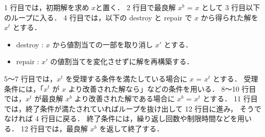 1 行目では，初期解を求め $x$と置く．
2 行目で最良解 $x^b$ = $x$ として 3 行目以下のループに入る．
4 行目では，以下の destroy と repair で $x$ から得られた解を $x^t$ とする．
\begin{itemize}
\item destroy : $x$ から値割当ての一部を取り消し $x′$ とする．
\item repair : $x′$ の値割当てを変化させずに解を再構築する．
\end{itemize}
5〜7 行目では，$x^t$ を受理する条件を満たしている場合に $x$ = $x^t$ とする．
受理条件には，「$x^t$ が $x$ より改善された解なら」などの条件を用いる．
8〜10 行目では，$x^t$ が最良解 $x^b$ より改善された解である場合に $x^b$ = $x^t$ とする．
11 行目では，終了条件が満たされていればループを抜け出して 12 行目に進み，
そうでなければ 4 行目に戻る．
終了条件には，繰り返し回数や制限時間などを用いる．
12 行目では，最良解 $x^b$ を返して終了する．